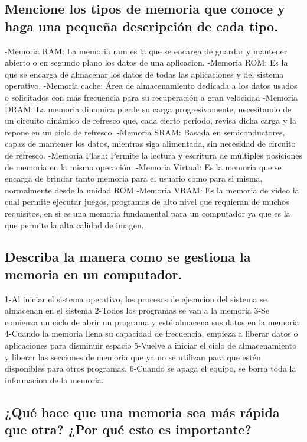 \documentclass{article}
\begin{document}
\subsection{Mencione los tipos de memoria que conoce y haga una pequeña descripción de cada tipo.}
-Memoria RAM: La memoria ram es la que se encarga de guardar y mantener abierto o en segundo plano los datos de una aplicacion.
-Memoria ROM: Es la que se encarga de almacenar los datos de todas las aplicaciones y del sistema operativo.
-Memoria cache: Área de almacenamiento dedicada a los datos usados o solicitados con más frecuencia para su recuperación a gran velocidad
-Memoria DRAM: La memoria dinamica pierde su carga progresivamente, necesitando de un circuito dinámico de refresco que, cada cierto período, revisa dicha carga y la repone en un ciclo de refresco.
-Memoria SRAM: Basada en semiconductores, capaz de mantener los datos, mientras siga alimentada, sin necesidad de circuito de refresco.
-Memoria Flash: Permite la lectura y escritura de múltiples posiciones de memoria en la misma operación.
-Memoria Virtual: Es la memoria que se encarga de brindar tanto memoria para el usuario como para si misma, normalmente desde la unidad ROM
-Memoria VRAM: Es la memoria de video la cual permite ejecutar juegos, programas de alto nivel que requieran de muchos requisitos, en si es una memoria fundamental para un computador ya que es la que permite la alta calidad de imagen.
\subsection{Describa la manera como se gestiona la memoria en un computador.}
1-Al iniciar el sistema operativo, los procesos de ejecucion del sistema se almacenan en el sistema
2-Todos los programas se van a la memoria
3-Se comienza un ciclo de abrir un programa y esté almacena sus datos en la memoria
4-Cuando la memoria llena su capacidad de frecuencia, empieza a liberar datos o aplicaciones para disminuir espacio
5-Vuelve a iniciar el ciclo de almacenamiento y  liberar las secciones de memoria que ya no se utilizan para que estén disponibles para otros programas. 
6-Cuando se apaga el equipo, se borra toda la informacion de la memoria.
\subsection{¿Qué hace que una memoria sea más rápida que otra? ¿Por qué esto es importante?}
\end{document}
